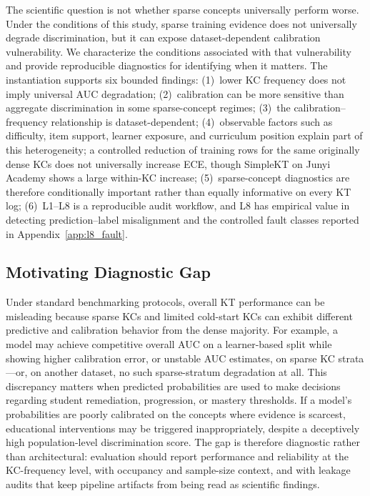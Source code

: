 The scientific question is not whether sparse concepts universally perform worse. Under the conditions of this study, sparse training evidence does not universally degrade discrimination, but it can expose dataset-dependent calibration vulnerability. We characterize the conditions associated with that vulnerability and provide reproducible diagnostics for identifying when it matters. The instantiation supports six bounded findings: (1)~lower KC frequency does not imply universal AUC degradation; (2)~calibration can be more sensitive than aggregate discrimination in some sparse-concept regimes; (3)~the calibration--frequency relationship is dataset-dependent; (4)~observable factors such as difficulty, item support, learner exposure, and curriculum position explain part of this heterogeneity; a controlled reduction of training rows for the same originally dense KCs does not universally increase ECE, though SimpleKT on Junyi Academy shows a large within-KC increase; (5)~sparse-concept diagnostics are therefore conditionally important rather than equally informative on every KT log; (6)~L1--L8 is a reproducible audit workflow, and L8 has empirical value in detecting prediction--label misalignment and the controlled fault classes reported in Appendix~\ref{app:l8_fault}.

\subsection{Motivating Diagnostic Gap}
Under standard benchmarking protocols, overall KT performance can be misleading because sparse KCs and limited cold-start KCs can exhibit different predictive and calibration behavior from the dense majority. For example, a model may achieve competitive overall AUC on a learner-based split while showing higher calibration error, or unstable AUC estimates, on sparse KC strata---or, on another dataset, no such sparse-stratum degradation at all. This discrepancy matters when predicted probabilities are used to make decisions regarding student remediation, progression, or mastery thresholds. If a model's probabilities are poorly calibrated on the concepts where evidence is scarcest, educational interventions may be triggered inappropriately, despite a deceptively high population-level discrimination score. The gap is therefore diagnostic rather than architectural: evaluation should report performance and reliability at the KC-frequency level, with occupancy and sample-size context, and with leakage audits that keep pipeline artifacts from being read as scientific findings.


